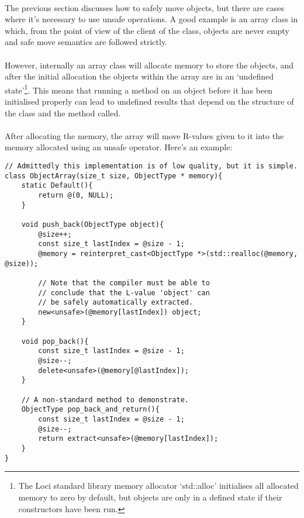 \documentclass[12pt,twoside,notitlepage]{report}
\begin{document}
\paragraph{}
The previous section discusses how to safely move objects, but there are cases where it's necessary to use unsafe operations. A good example is an array class in which, from the point of view of the client of the class, objects are never empty and safe move semantics are followed strictly.

\paragraph{}
However, internally an array class will allocate memory to store the objects, and after the initial allocation the objects within the array are in an `undefined state'\footnote{The Loci standard library memory allocator `std::alloc' initialises all allocated memory to zero by default, but objects are only in a defined state if their constructors have been run.}. This means that running a method on an object before it has been initialised properly can lead to undefined results that depend on the structure of the class and the method called.

\paragraph{}
After allocating the memory, the array will move R-values given to it into the memory allocated using an unsafe operator. Here's an example:

\begin{lstlisting}
// Admittedly this implementation is of low quality, but it is simple.
class ObjectArray(size_t size, ObjectType * memory){
	static Default(){
		return @(0, NULL);
	}
	
	void push_back(ObjectType object){
		@size++;
		const size_t lastIndex = @size - 1;
		@memory = reinterpret_cast<ObjectType *>(std::realloc(@memory, @size));
		
		// Note that the compiler must be able to
		// conclude that the L-value 'object' can
		// be safely automatically extracted.
		new<unsafe>(@memory[lastIndex]) object;
	}
	
	void pop_back(){
		const size_t lastIndex = @size - 1;
		@size--;
		delete<unsafe>(@memory[@lastIndex]);
	}
	
	// A non-standard method to demonstrate.
	ObjectType pop_back_and_return(){
		const size_t lastIndex = @size - 1;
		@size--;
		return extract<unsafe>(@memory[lastIndex]);
	}
}
\end{lstlisting}
\end{document}
